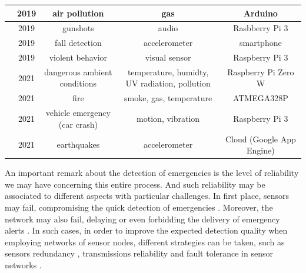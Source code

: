 \begin{refsection}
\begin{table}
\begin{tabular}{|c|c|c|c|c|}
    \hline
    \citeauthor{iotPollution1} \cite{iotPollution1} & 2019 & air pollution & gas & Arduino \\
    
    \hline
    \citeauthor{iotAudio1} \cite{iotAudio1} & 2019 & gunshots & audio & Rasbberry Pi 3 \\
    
    \hline
    \citeauthor{ThresholdBasedFallDetection2019} \cite{ThresholdBasedFallDetection2019} & 2019 & fall detection & accelerometer & smartphone \\
    
    \hline
    \citeauthor{visualdataEmergency5} \cite{visualdataEmergency5} & 2019 & violent behavior & visual sensor & Raspberry Pi 3 \\
    
    \hline
    \citeauthor{iotBike1} \cite{iotBike1} & 2021 & dangerous ambient conditions & temperature, humidty, UV radiation, pollution & Raspberry Pi Zero W \\
    
    \hline
    \citeauthor{iotFire3} \cite{iotFire3} & 2021 & fire & smoke, gas, temperature & ATMEGA328P\\
    
    \hline
    \citeauthor{CarCrash2021} \cite{CarCrash2021} & 2021 & vehicle emergency (car crash) & motion, vibration & Raspberry Pi 3 \\
    
    \hline
    \citeauthor{earthquakesDetection2011} \cite{earthquakesDetection2011} & 2021 & earthquakes &  accelerometer & Cloud (Google App Engine) \\
    
\end{tabular}
\end{table}

An important remark about the detection of emergencies is the level of reliability we may have concerning this entire process. And such reliability may be associated to different aspects with particular challenges. In first place, sensors may fail, compromising the quick detection of emergencies \cite{availability1,availability2}. Moreover, the network may also fail, delaying or even forbidding the delivery of emergency alerts \cite{networking1,networking2}.
In such cases, in order to improve the expected detection quality when employing networks of sensor nodes, different strategies can be taken, such as sensors redundancy \cite{redundancy2}, transmissions reliability \cite{reliability1} and fault tolerance in sensor networks \cite{redundancy1}. 


\end{refsection}
